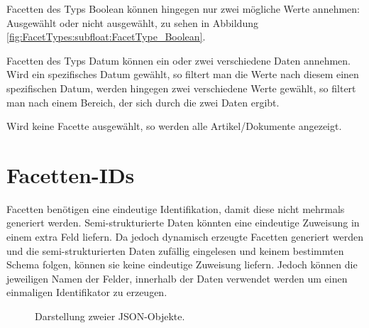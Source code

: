 Facetten des Typs Boolean können hingegen nur zwei mögliche Werte annehmen: Ausgewählt oder nicht ausgewählt, zu sehen in Abbildung \ref{fig:FacetTypes:subfloat:FacetType_Boolean}.

Facetten des Typs Datum können ein oder zwei verschiedene Daten annehmen.
Wird ein spezifisches Datum gewählt, so filtert man die Werte nach diesem einen spezifischen Datum,
werden hingegen zwei verschiedene Werte gewählt, so filtert man nach einem Bereich, der sich durch die zwei Daten ergibt.

Wird keine Facette ausgewählt, so werden alle Artikel/Dokumente angezeigt.

\section{Facetten-IDs}
\label{sec:Konzeption:FacetIDs}
Facetten benötigen eine eindeutige Identifikation, damit diese nicht mehrmals generiert werden.
Semi-strukturierte Daten könnten eine eindeutige Zuweisung in einem extra Feld liefern. 
Da jedoch dynamisch erzeugte Facetten generiert werden und die semi-strukturierten Daten zufällig eingelesen und keinem bestimmten Schema folgen, können sie keine eindeutige Zuweisung liefern.
Jedoch können die jeweiligen Namen der Felder, innerhalb der Daten verwendet werden um einen einmaligen Identifikator zu erzeugen.

\begin{figure}[h]
    \myfloatalign
    \quad
    \caption{Darstellung zweier JSON-Objekte.}
    \label{fig:facetIds:jsonObjects}
\end{figure}

